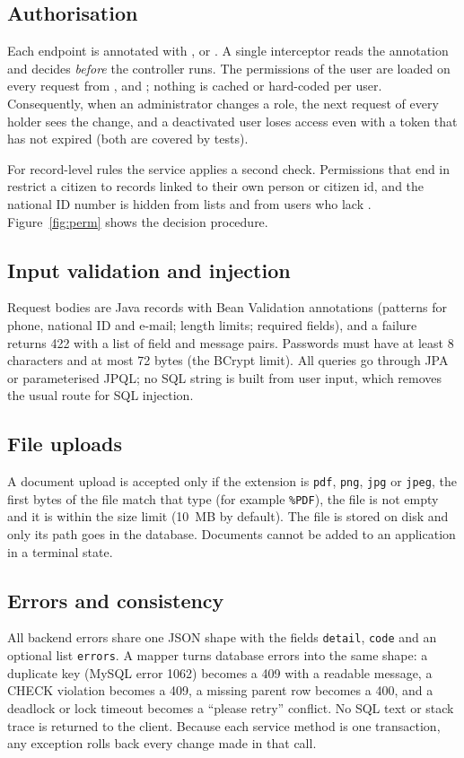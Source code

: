 \subsection{Authorisation}
Each endpoint is annotated with ,  or
. A single interceptor reads the annotation and decides \emph{before} the
controller runs. The permissions of the user are loaded on every request from
,  and ; nothing is cached or
hard-coded per user. Consequently, when an administrator changes a role, the next request
of every holder sees the change, and a deactivated user loses access even with a token that
has not expired (both are covered by tests).

For record-level rules the service applies a second check. Permissions that end in
 restrict a citizen to records linked to their own person or citizen id, and the
national ID number is hidden from lists and from users who lack
. Figure~\ref{fig:perm} shows the decision procedure.


\subsection{Input validation and injection}
Request bodies are Java records with Bean Validation annotations (patterns for phone,
national ID and e-mail; length limits; required fields), and a failure returns 422 with a
list of field and message pairs. Passwords must have at least 8 characters and at most 72
bytes (the BCrypt limit). All queries go through JPA or parameterised JPQL; no SQL string
is built from user input, which removes the usual route for SQL injection.

\subsection{File uploads}
A document upload is accepted only if the extension is \texttt{pdf}, \texttt{png},
\texttt{jpg} or \texttt{jpeg}, the first bytes of the file match that type (for example
\texttt{\%PDF}), the file is not empty and it is within the size limit (10~MB by
default). The file is stored on disk and only its path goes in the database. Documents
cannot be added to an application in a terminal state.

\subsection{Errors and consistency}
All backend errors share one JSON shape with the fields \texttt{detail}, \texttt{code} and an optional list \texttt{errors}. A mapper turns
database errors into the same shape: a duplicate key (MySQL error 1062) becomes a 409 with
a readable message, a CHECK violation becomes a 409, a missing parent row becomes a 400,
and a deadlock or lock timeout becomes a ``please retry'' conflict. No SQL text or stack
trace is returned to the client. Because each service method is one transaction, any
exception rolls back every change made in that call.

